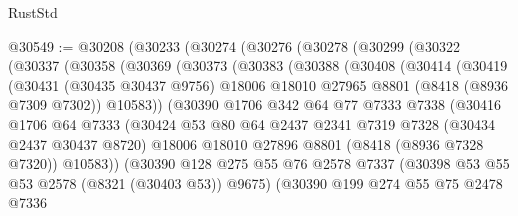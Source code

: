 \begin{lexlean}{RustStd}
\begin{coremodule}
@30549 := @30208
    (@30233
      (@30274
        (@30276
          (@30278
            (@30299
              (@30322
                (@30337
                  (@30358
                    (@30369
                      (@30373
                        (@30383
                          (@30388
                            (@30408
                              (@30414
                                (@30419
                                  (@30431
                                    (@30435 @30437 @9756)
                                    @18006
                                    @18010
                                    @27965
                                    @8801
                                    (@8418 (@8936 @7309 @7302))
                                    @10583))
                                (@30390
                                  @1706
                                  @342
                                  @64
                                  @77
                                  @7333
                                  @7338
                                  (@30416
                                    @1706
                                    @64
                                    @7333
                                    (@30424
                                      @53
                                      @80
                                      @64
                                      @2437
                                      @2341
                                      @7319
                                      @7328
                                      (@30434 @2437 @30437 @8720)
                                      @18006
                                      @18010
                                      @27896
                                      @8801
                                      (@8418 (@8936 @7328 @7320))
                                      @10583))
                                  (@30390
                                    @128
                                    @275
                                    @55
                                    @76
                                    @2578
                                    @7337
                                    (@30398 @53 @55 @53 @2578 (@8321 (@30403 @53)) @9675)
                                    (@30390
                                      @199
                                      @274
                                      @55
                                      @75
                                      @2478
                                      @7336

\end{coremodule}
\end{lexlean}
